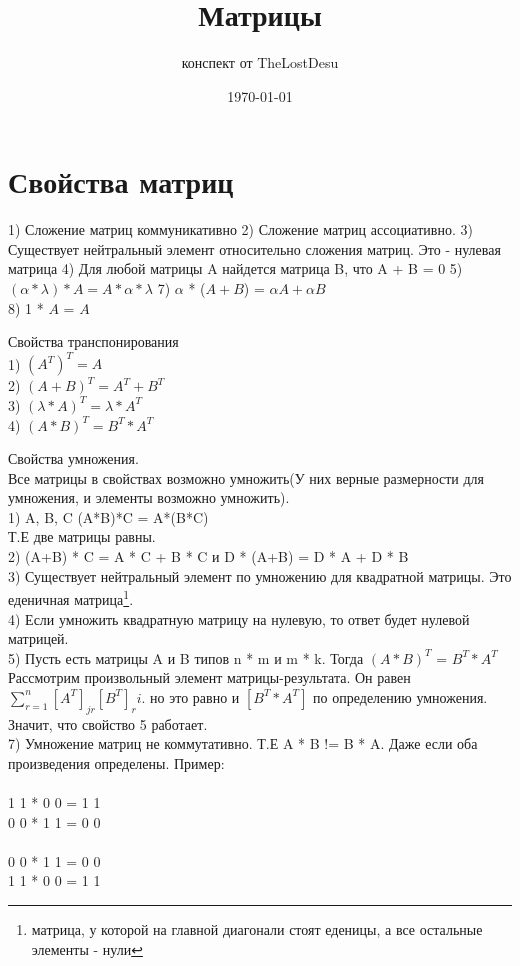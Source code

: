 \documentclass[a4paper,12pt]{article}
\author{конспект от TheLostDesu}
\title{Матрицы}
\date{\today}
\begin{document}
\maketitle
\section{Свойства матриц}
1) Сложение матриц коммуникативно
2) Сложение матриц ассоциативно.
3) Существует нейтральный элемент относительно сложения матриц. Это - нулевая матрица
4) Для любой матрицы A найдется матрица B, что A + B = 0
5) $(\alpha * \lambda) * A  = A * \alpha * \lambda$ 
7) $\alpha $ * ($A + B$) = $\alpha A +\alpha B$\\
8) 1 * $A$ = $A$

Свойства транспонирования\\
1) $(A^T)^T = A$\\
2) $(A+B)^T = A^T+B^T$\\
3) $(\lambda * A)^T = \lambda * A ^ T$\\
4) $(A * B) ^ T = B^T * A^T$

Свойства умножения.\\
Все матрицы в свойствах возможно умножить(У них верные размерности для умножения, и элементы возможно умножить).\\
1) A, B, C (A*B)*C = A*(B*C)\\
Т.Е две матрицы равны.\\
2) (A+B) * C = A * C + B * C и D * (A+B) = D * A + D * B\\
3) Существует нейтральный элемент по умножению для квадратной матрицы. Это еденичная матрица\footnote{матрица, у которой на главной диагонали стоят еденицы, а все остальные элементы - нули}.\\
4) Если умножить квадратную матрицу на нулевую, то ответ будет нулевой матрицей.\\
5) Пусть есть матрицы A и B типов n * m и m * k. Тогда $(A * B)^T$ = $B^T * A ^T$\\
Рассмотрим произвольный элемент матрицы-результата. Он равен $\sum^n_{r=1} \left[ A^T \right] _{jr} \left[ B^T \right] _ri$. но это равно и $\left[ B^T * A^T \right]$ по определению умножения. Значит, что свойство 5 работает.\\
7) Умножение матриц не коммутативно. Т.Е A * B != B * A. Даже если оба произведения определены. Пример: \\
\\
1 1 * 0 0 = 1 1\\  
0 0 * 1 1 = 0 0\\
\\
0 0 * 1 1 = 0 0\\
1 1 * 0 0 = 1 1\\
\end{document}

